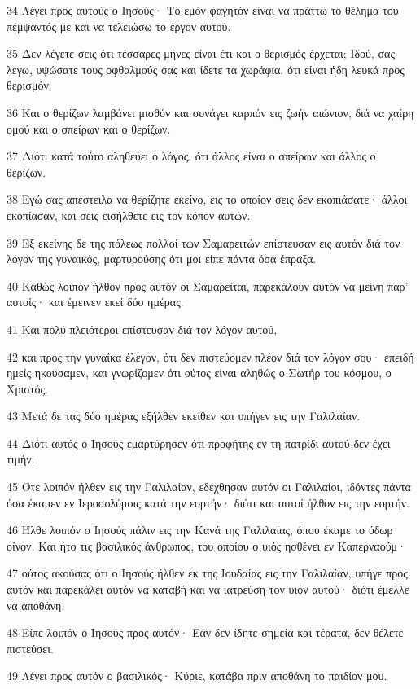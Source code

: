 \par 34 Λέγει προς αυτούς ο Ιησούς· Το εμόν φαγητόν είναι να πράττω το θέλημα του πέμψαντός με και να τελειώσω το έργον αυτού.
\par 35 Δεν λέγετε σεις ότι τέσσαρες μήνες είναι έτι και ο θερισμός έρχεται; Ιδού, σας λέγω, υψώσατε τους οφθαλμούς σας και ίδετε τα χωράφια, ότι είναι ήδη λευκά προς θερισμόν.
\par 36 Και ο θερίζων λαμβάνει μισθόν και συνάγει καρπόν εις ζωήν αιώνιον, διά να χαίρη ομού και ο σπείρων και ο θερίζων.
\par 37 Διότι κατά τούτο αληθεύει ο λόγος, ότι άλλος είναι ο σπείρων και άλλος ο θερίζων.
\par 38 Εγώ σας απέστειλα να θερίζητε εκείνο, εις το οποίον σεις δεν εκοπιάσατε· άλλοι εκοπίασαν, και σεις εισήλθετε εις τον κόπον αυτών.
\par 39 Εξ εκείνης δε της πόλεως πολλοί των Σαμαρειτών επίστευσαν εις αυτόν διά τον λόγον της γυναικός, μαρτυρούσης ότι μοι είπε πάντα όσα έπραξα.
\par 40 Καθώς λοιπόν ήλθον προς αυτόν οι Σαμαρείται, παρεκάλουν αυτόν να μείνη παρ' αυτοίς· και έμεινεν εκεί δύο ημέρας.
\par 41 Και πολύ πλειότεροι επίστευσαν διά τον λόγον αυτού,
\par 42 και προς την γυναίκα έλεγον, ότι δεν πιστεύομεν πλέον διά τον λόγον σου· επειδή ημείς ηκούσαμεν, και γνωρίζομεν ότι ούτος είναι αληθώς ο Σωτήρ του κόσμου, ο Χριστός.
\par 43 Μετά δε τας δύο ημέρας εξήλθεν εκείθεν και υπήγεν εις την Γαλιλαίαν.
\par 44 Διότι αυτός ο Ιησούς εμαρτύρησεν ότι προφήτης εν τη πατρίδι αυτού δεν έχει τιμήν.
\par 45 Ότε λοιπόν ήλθεν εις την Γαλιλαίαν, εδέχθησαν αυτόν οι Γαλιλαίοι, ιδόντες πάντα όσα έκαμεν εν Ιεροσολύμοις κατά την εορτήν· διότι και αυτοί ήλθον εις την εορτήν.
\par 46 Ήλθε λοιπόν ο Ιησούς πάλιν εις την Κανά της Γαλιλαίας, όπου έκαμε το ύδωρ οίνον. Και ήτο τις βασιλικός άνθρωπος, του οποίου ο υιός ησθένει εν Καπερναούμ·
\par 47 ούτος ακούσας ότι ο Ιησούς ήλθεν εκ της Ιουδαίας εις την Γαλιλαίαν, υπήγε προς αυτόν και παρεκάλει αυτόν να καταβή και να ιατρεύση τον υιόν αυτού· διότι έμελλε να αποθάνη.
\par 48 Είπε λοιπόν ο Ιησούς προς αυτόν· Εάν δεν ίδητε σημεία και τέρατα, δεν θέλετε πιστεύσει.
\par 49 Λέγει προς αυτόν ο βασιλικός· Κύριε, κατάβα πριν αποθάνη το παιδίον μου.
